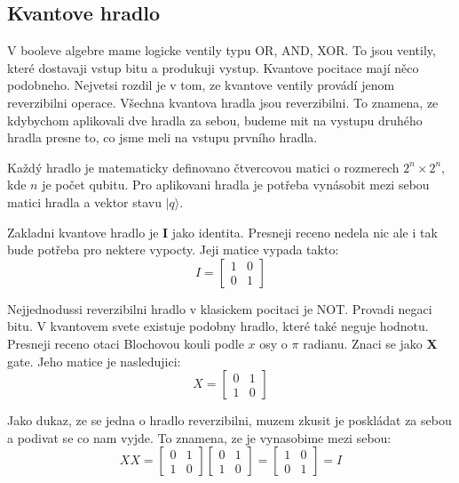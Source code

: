 \documentclass[11pt]{article}
\begin{document}
\subsection{Kvantove hradlo}
V booleve algebre mame logicke ventily typu OR, AND, XOR. To jsou ventily, které dostavaji vstup bitu a produkuji vystup. Kvantove pocitace mají něco podobneho. Nejvetsi rozdil je v tom, ze kvantove ventily provádí jenom reverzibilni operace.
Všechna kvantova hradla jsou reverzibilni. To znamena, ze kdybychom aplikovali dve hradla za sebou, budeme mit na vystupu druhého hradla presne to, co jsme meli na vstupu prvního hradla.
\par Každý hradlo je matematicky definovano čtvercovou matici o rozmerech $2^n \times 2^n$, kde $n$ je počet qubitu. Pro aplikovani hradla je potřeba vynásobit mezi sebou matici hradla a vektor stavu $|q\rangle$.
\par Zakladni kvantove hradlo je \textbf{I} jako identita. Presneji receno nedela nic ale i tak bude potřeba pro nektere vypocty. Jeji matice vypada takto:
$$I = \begin{bmatrix}
        1 & 0 \\
        0 & 1
    \end{bmatrix}$$
\par Nejjednodussi reverzibilni hradlo v klasickem pocitaci je NOT.
Provadi negaci bitu. V kvantovem svete existuje podobny hradlo, které také neguje hodnotu.
Presneji receno otaci  Blochovou kouli podle $x$ osy o $\pi$ radianu. Znaci se jako \textbf{X} gate.
Jeho matice je nasledujici:
$$X = \begin{bmatrix}
        0 & 1 \\
        1 & 0
    \end{bmatrix}$$
\par Jako dukaz, ze se jedna o hradlo reverzibilni, muzem zkusit je poskládat za sebou a podivat se co nam vyjde.
To znamena, ze je vynasobime mezi sebou:
$$XX = \begin{bmatrix}
        0 & 1 \\
        1 & 0
    \end{bmatrix}\begin{bmatrix}
        0 & 1 \\
        1 & 0
    \end{bmatrix} = \begin{bmatrix}
        1 & 0 \\
        0 & 1
    \end{bmatrix} = I$$
\end{document}
